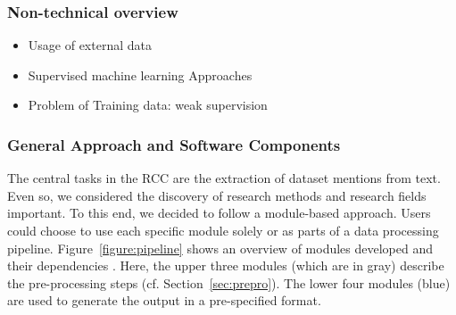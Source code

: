 


\subsubsection{Non-technical overview}

\begin{itemize}
    \item Usage of external data
    \item Supervised machine learning Approaches
    \item Problem of Training data: weak supervision
\end{itemize}




\subsubsection{General Approach and Software Components}
The central tasks in the RCC are the extraction of dataset mentions from text. 
Even so, we considered the discovery of research methods and research fields important.
To this end, we decided to follow a module-based approach. Users could choose to use each specific module solely or as parts of a data processing pipeline.
Figure~\ref{figure:pipeline} shows an overview of modules developed  and their dependencies . Here, the upper three modules (which are in gray) describe the pre-processing steps (cf. Section~\ref{sec:prepro}).
The lower four modules (blue) are used to generate the output in a pre-specified format. 

